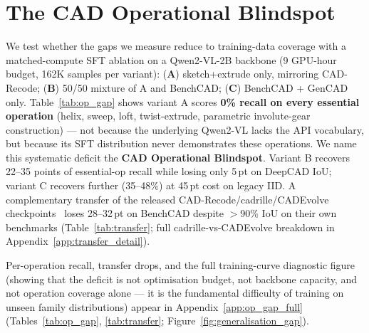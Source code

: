 \section{The CAD Operational Blindspot}
\label{sec:transfer}
\label{sec:op_gap}

We test whether the gaps we measure reduce to training-data coverage with a matched-compute SFT ablation on a Qwen2-VL-2B backbone (9 GPU-hour budget, 162K samples per variant): (\textbf{A}) sketch+extrude only, mirroring CAD-Recode; (\textbf{B}) 50/50 mixture of A and BenchCAD; (\textbf{C}) BenchCAD + GenCAD only.
Table~\ref{tab:op_gap} shows variant A scores \textbf{0\% recall on every essential operation} (helix, sweep, loft, twist-extrude, parametric involute-gear construction) --- not because the underlying Qwen2-VL lacks the API vocabulary, but because its SFT distribution never demonstrates these operations.
We name this systematic deficit the \textbf{CAD Operational Blindspot}.
Variant B recovers 22--35 points of essential-op recall while losing only 5\,pt on DeepCAD IoU; variant C recovers further (35--48\%) at 45\,pt cost on legacy IID.
A complementary transfer of the released CAD-Recode/cadrille/CADEvolve checkpoints~\citep{Rukhovich2025,Kolodiazhnyi2026,Elistratov2026} loses 28--32\,pt on BenchCAD despite $>$90\% IoU on their own benchmarks (Table~\ref{tab:transfer}; full cadrille-vs-CADEvolve breakdown in Appendix~\ref{app:transfer_detail}).

Per-operation recall, transfer drops, and the full training-curve diagnostic figure (showing that the deficit is not optimisation budget, not backbone capacity, and not operation coverage alone --- it is the fundamental difficulty of training on unseen family distributions) appear in Appendix~\ref{app:op_gap_full} (Tables~\ref{tab:op_gap}, \ref{tab:transfer}; Figure~\ref{fig:generalisation_gap}).
